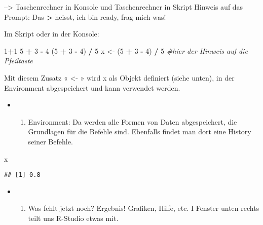 \documentclass[
]{book}
\newenvironment{Shaded}{\begin{snugshade}}{\end{snugshade}}
\newcommand{\CommentTok}[1]{\textcolor[rgb]{0.56,0.35,0.01}{\textit{#1}}}
\newcommand{\DecValTok}[1]{\textcolor[rgb]{0.00,0.00,0.81}{#1}}
\newcommand{\NormalTok}[1]{#1}
\newcommand{\OperatorTok}[1]{\textcolor[rgb]{0.81,0.36,0.00}{\textbf{#1}}}
\newcommand{\StringTok}[1]{\textcolor[rgb]{0.31,0.60,0.02}{#1}}
\providecommand{\tightlist}{%
  \setlength{\itemsep}{0pt}\setlength{\parskip}{0pt}}
\begin{document}
--\textgreater{} Taschenrechner in Konsole und Taschenrechner in Skript
Hinweis auf das Prompt:
Das \textbf{\textgreater{}} heisst, ich bin ready, frag mich was!

Im Skript oder in der Konsole:

\begin{Shaded}
\begin{Highlighting}[]
\DecValTok{1}\OperatorTok{+}\DecValTok{1}
\DecValTok{5} \OperatorTok{+}\StringTok{ }\DecValTok{3} \OperatorTok{-}\StringTok{ }\DecValTok{4}
\NormalTok{(}\DecValTok{5} \OperatorTok{+}\StringTok{ }\DecValTok{3} \OperatorTok{-}\StringTok{ }\DecValTok{4}\NormalTok{) }\OperatorTok{/}\StringTok{ }\DecValTok{5}
\NormalTok{x <-}\StringTok{ }\NormalTok{(}\DecValTok{5} \OperatorTok{+}\StringTok{ }\DecValTok{3} \OperatorTok{-}\StringTok{ }\DecValTok{4}\NormalTok{) }\OperatorTok{/}\StringTok{ }\DecValTok{5} \CommentTok{#hier der Hinweis auf die Pfeiltaste}
\end{Highlighting}
\end{Shaded}

Mit diesem Zusatz « \textless- » wird x als Objekt definiert (siehe unten), in der Environment abgespeichert und
kann verwendet werden.

\begin{itemize}
\item
  \begin{enumerate}
  \def\labelenumi{\arabic{enumi}.}
  \setcounter{enumi}{2}
  \tightlist
  \item
    Environment: Da werden alle Formen von Daten abgespeichert, die Grundlagen für die Befehle sind. Ebenfalls findet man dort eine History seiner Befehle.
  \end{enumerate}
\end{itemize}

\begin{Shaded}
\begin{Highlighting}[]
\NormalTok{x}
\end{Highlighting}
\end{Shaded}

\begin{verbatim}
## [1] 0.8
\end{verbatim}

\begin{itemize}
\item
  \begin{enumerate}
  \def\labelenumi{\arabic{enumi}.}
  \setcounter{enumi}{3}
  \tightlist
  \item
    Was fehlt jetzt noch? Ergebnis! Grafiken, Hilfe, etc. I Fenster unten rechts teilt uns R-Studio etwas mit.
  \end{enumerate}
\end{itemize}
\end{document}
